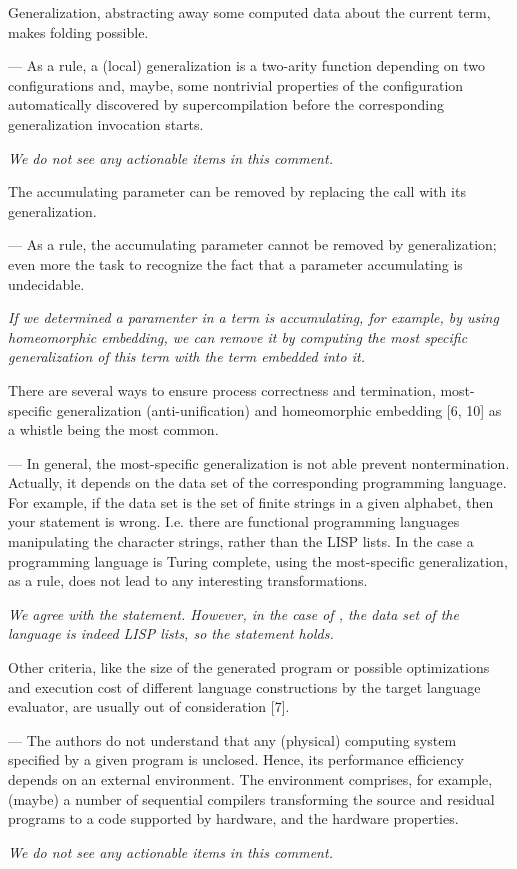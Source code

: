 \begin{enumerate}
{    \item{
      Generalization, abstracting away some computed data about the current term, makes folding possible.

      --- As a rule, a (local) generalization is a two-arity function depending on two configurations and, maybe, some nontrivial properties of the configuration automatically discovered by supercompilation before the corresponding generalization invocation starts.

      \emph{We do not see any actionable items in this comment.}
    }

    \item{
      The accumulating parameter can be removed by replacing the call with its generalization.

      --- As a rule, the accumulating parameter cannot be removed by generalization; even more the task to recognize the fact that a parameter accumulating is undecidable.

      \emph{If we determined a paramenter in a term is accumulating, for example, by using homeomorphic embedding, we can remove it by computing the most specific generalization of this term with the term embedded into it.}
    }

    \item{
      There are several ways to ensure process correctness and termination, most-specific generalization (anti-unification) and homeomorphic embedding [6, 10] as a whistle being the most common.

      --- In general, the most-specific generalization is not able prevent nontermination. Actually, it depends on the data set of the corresponding programming language. For example, if the data set is the set of finite strings in a given alphabet, then your statement is wrong. I.e. there are functional programming languages manipulating the character strings, rather than the LISP lists. In the case a programming language is Turing complete, using the most-specific generalization, as a rule, does not lead to any interesting transformations.

      \emph{We agree with the statement. However, in the case of \mk, the data set of the language is indeed LISP lists, so the statement holds. }
    }

    \item{Other criteria, like the size of the generated program or possible optimizations and execution cost of different language constructions by the target language evaluator, are usually out of consideration [7].

    --- The authors do not understand that any (physical) computing system specified by a given program is unclosed. Hence, its performance efficiency depends on an external environment. The environment comprises, for example, (maybe) a number of sequential compilers transforming the source and residual programs to a code supported by hardware, and the hardware properties.

    \emph{We do not see any actionable items in this comment.}
    }

  }
\end{enumerate}

